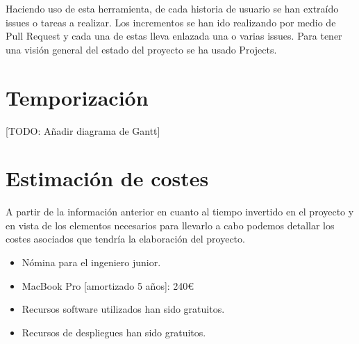 Haciendo uso de esta herramienta, de cada historia de usuario se han extraído issues o tareas a realizar. Los
incrementos se han ido realizando por medio de Pull Request y cada una de estas lleva enlazada una o varias
issues. Para tener una visión general del estado del proyecto se ha usado Projects.

\section{Temporización}
[TODO: Añadir diagrama de Gantt]

\section{Estimación de costes}
A partir de la información anterior en cuanto al tiempo invertido en el proyecto y en vista de los elementos necesarios
para llevarlo a cabo podemos detallar los costes asociados que tendría la elaboración del proyecto.

\begin{itemize}
    \item Nómina para el ingeniero junior.
    \item MacBook Pro [amortizado 5 años]: 240€
    \item Recursos software utilizados han sido gratuitos.
    \item Recursos de despliegues han sido gratuitos.
\end{itemize}